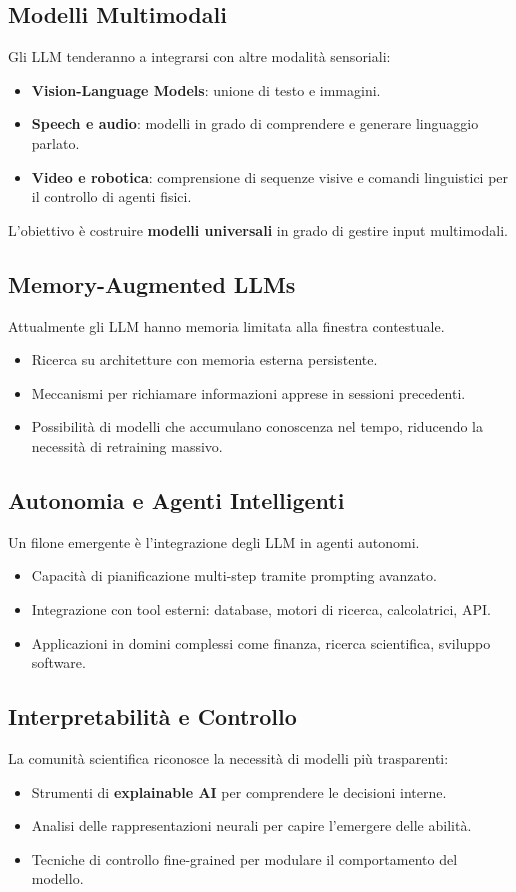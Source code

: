 \subsection{Modelli Multimodali}
Gli LLM tenderanno a integrarsi con altre modalità sensoriali:
\begin{itemize}
    \item \textbf{Vision-Language Models}: unione di testo e immagini.
    \item \textbf{Speech e audio}: modelli in grado di comprendere e generare linguaggio parlato.
    \item \textbf{Video e robotica}: comprensione di sequenze visive e comandi linguistici per il controllo di agenti fisici.
\end{itemize}
L'obiettivo è costruire \textbf{modelli universali} in grado di gestire input multimodali.

\subsection{Memory-Augmented LLMs}
Attualmente gli LLM hanno memoria limitata alla finestra contestuale.
\begin{itemize}
    \item Ricerca su architetture con memoria esterna persistente.
    \item Meccanismi per richiamare informazioni apprese in sessioni precedenti.
    \item Possibilità di modelli che accumulano conoscenza nel tempo, riducendo la necessità di retraining massivo.
\end{itemize}

\subsection{Autonomia e Agenti Intelligenti}
Un filone emergente è l'integrazione degli LLM in agenti autonomi.
\begin{itemize}
    \item Capacità di pianificazione multi-step tramite prompting avanzato.
    \item Integrazione con tool esterni: database, motori di ricerca, calcolatrici, API.
    \item Applicazioni in domini complessi come finanza, ricerca scientifica, sviluppo software.
\end{itemize}

\subsection{Interpretabilità e Controllo}
La comunità scientifica riconosce la necessità di modelli più trasparenti:
\begin{itemize}
    \item Strumenti di \textbf{explainable AI} per comprendere le decisioni interne.
    \item Analisi delle rappresentazioni neurali per capire l'emergere delle abilità.
    \item Tecniche di controllo fine-grained per modulare il comportamento del modello.
\end{itemize}

